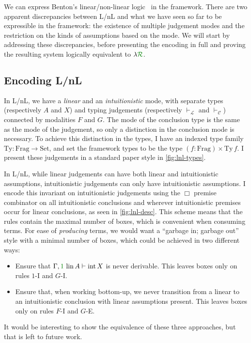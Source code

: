We can express Benton's linear/non-linear logic~\cite{Benton94} in the
framework.
There are two apparent discrepancies between L/nL and what we have seen so far
to be expressible in the framework: the existence of multiple judgement modes
and the restriction on the kinds of assumptions based on the mode.
We will start by addressing these discrepancies, before presenting the encoding
in full and proving the resulting system logically equivalent to
$\lambda\gr{\mathcal R}$.

\subsection{Encoding L/nL}

In L/nL, we have a \emph{linear} and an \emph{intuitionistic} mode, with
separate types (respectively $A$ and $X$) and typing judgements (respectively
$\vdash_{\mathcal L}$ and $\vdash_{\mathcal C}$) connected by modalities $F$ and
$G$.
The mode of the conclusion type is the same as the mode of the judgement, so
only a distinction in the conclusion mode is necessary.
To achieve this distinction in the types, I have an indexed type family
$\mathrm{Ty} : \mathrm{Frag} \to \mathrm{Set}$, and set the framework types to
be the type $(f : \mathrm{Frag}) \times \mathrm{Ty}\,f$.
I present these judgements in a standard paper style in \cref{fig:lnl-types}.

In L/nL, while linear judgements can have both linear and intuitionistic
assumptions, intuitionistic judgements can only have intuitionistic assumptions.
I encode this invariant on intuitionistic judgements using the $\Box$
premise combinator on all intuitionistic conclusions and wherever
intuitionistic premises occur for linear conclusions, as seen in
\cref{fig:lnl-desc}.
This scheme means that the rules contain the maximal number of boxes, which is
convenient when consuming terms.
For ease of \emph{producing} terms, we would want a ``garbage in; garbage out''
style with a minimal number of boxes, which could be achieved in two different
ways:
\begin{itemize}
  \item Ensure that $\Gamma, \gr1\,\lin A \vdash \intu X$ is never derivable.
    This leaves boxes only on rules $1$-I and $G$-I.
  \item Ensure that, when working bottom-up, we never transition from a linear
    to an intuitionistic conclusion with linear assumptions present.
    This leaves boxes only on rules $F$-I and $G$-E.
\end{itemize}
It would be interesting to show the equivalence of these three approaches, but
that is left to future work.


